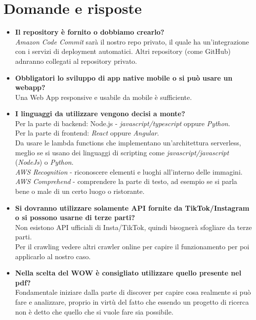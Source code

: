 \documentclass{classes/base}
\begin{document}
    \section*{Domande e risposte}
    \begin{itemize}
        \item  \textbf{Il repository è fornito o dobbiamo crearlo?}
        \\\textit{Amazon Code Commit} sarà il nostro repo privato, il quale ha un'integrazione con i servizi di deployment automatici.
        Altri repository (come GitHub) adnranno collegati al repository privato.        
        \item  \textbf{Obbligatori lo sviluppo di app native mobile o si può usare un webapp?}
        \\Una Web App responsive e usabile da mobile è sufficiente.
        \item  \textbf{I linguaggi da utilizzare vengono decisi a monte?} 
        \\Per la parte di backend: Node.js - \textit{javascript/typescript} oppure \textit{Python}.\\
            Per la parte di frontend: \textit{React} oppure \textit{Angular}.\\
            Da usare le lambda functions che implementano un'architettura serverless, meglio se si usano dei linguaggi di scripting come \textit{javascript/javascript} (\textit{NodeJs}) o \textit{Python}.\\
            \textit{AWS Recognition} - riconoscere elementi e luoghi all'interno delle immagini.\\
            \textit{AWS Comprehend} - comprendere la parte di testo, ad esempio se si parla bene o male di un certo luogo o ristorante.
        \item  \textbf{Si dovranno utilizzare solamente API fornite da TikTok/Instagram o si possono usarne di terze parti?}
        \\Non esistono API ufficiali di Insta/TikTok, quindi bisognerà sfogliare da terze parti.\\
            Per il crawling vedere altri crawler online per capire il funzionamento per poi applicarlo al nostro caso.
        \item  \textbf{Nella scelta del WOW è consigliato utilizzare quello presente nel pdf?}
        \\Fondamentale iniziare dalla parte di discover per capire cosa realmente si può fare e analizzare, proprio in virtù del fatto che essendo un progetto di ricerca non è detto che quello che si vuole fare sia possibile. 

\end{itemize}
\end{document}
